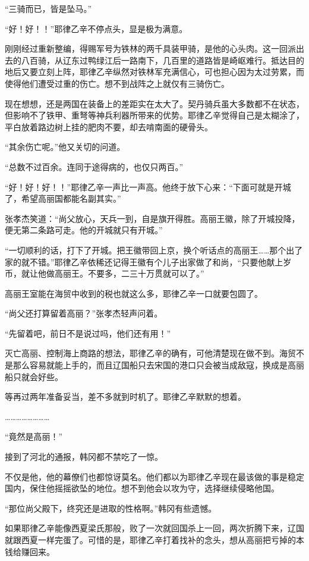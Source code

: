 “三骑而已，皆是坠马。”

“好！好！！”耶律乙辛不停点头，显是极为满意。

刚刚经过重新整编，得赐军号为铁林的两千具装甲骑，是他的心头肉。这一回派出去的八百骑，从辽东过鸭绿江后一路南下，几百里的道路皆是崎岖难行。抵达目的地后又要立刻上阵，耶律乙辛纵然对铁林军充满信心，可也担心因为太过劳累，而使得他们遭受过重的伤亡。想不到战阵之上就仅有三骑伤亡。

现在想想，还是两国在装备上的差距实在太大了。契丹骑兵虽大多数都不在状态，但影响不了铁甲、重弩等神兵利器所带来的优势。耶律乙辛觉得自己是太糊涂了，平白放着路边树上挂的肥肉不要，却去啃南面的硬骨头。

“其余伤亡呢。”他又关切的问道。

“总数不过百余。连同于途得病的，也仅只两百。”

“好！好！好！！”耶律乙辛一声比一声高。他终于放下心来：“下面可就是开城了，希望高丽国都能名副其实。”

张孝杰笑道：“尚父放心，天兵一到，自是旗开得胜。高丽王徽，除了开城投降，便无第二条路可走。他的开城就只有开城。”

“一切顺利的话，打下了开城。把王徽带回上京，换个听话点的高丽王……那个出了家的就不错。”耶律乙辛依稀还记得王徽有个儿子出家做了和尚，“只要他献上岁币，就让他做高丽王。不要多，二三十万贯就可以了。”

高丽王室能在海贸中收到的税也就这么多，耶律乙辛一口就要包圆了。

“尚父还打算留着高丽？”张孝杰轻声问着。

“先留着吧，前日不是说过吗，他们还有用！”

灭亡高丽、控制海上商路的想法，耶律乙辛的确有，可他清楚现在做不到。海贸不是那么容易就能上手的，而且辽国船只去宋国的港口只会被当成敌寇，换成是高丽船只就会好些。

等再过两年准备妥当，差不多就到时机了。耶律乙辛默默的想着。

……………………

“竟然是高丽！”

接到了河北的通报，韩冈都不禁吃了一惊。

不仅是他，他的幕僚们也都惊讶莫名。他们都以为耶律乙辛现在最该做的事是稳定国内，保住他摇摇欲坠的地位。想不到他会以攻为守，选择继续侵略他国。

“那位尚父殿下，终究还是进取的性格啊。”韩冈有些遗憾。

如果耶律乙辛能像西夏梁氏那般，败了一次就回国杀上一回，两次折腾下来，辽国就跟西夏一样完蛋了。可惜的是，耶律乙辛打着找补的念头，想从高丽把亏掉的本钱给赚回来。

